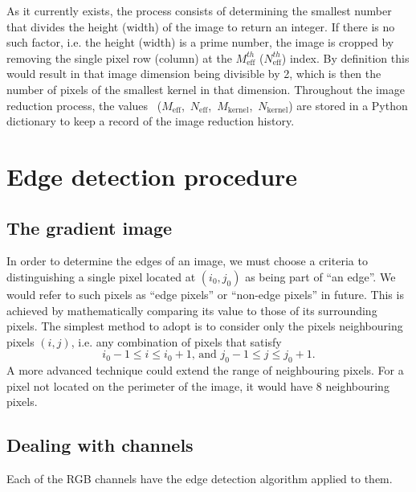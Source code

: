 \documentclass[11pt]{article}
\begin{document}
As it currently exists, the process consists of determining the smallest number that divides the height (width) of the image to return an integer. If there is no such factor, i.e. the height (width) is a prime number, the image is cropped by removing the single pixel row (column) at the $M_{\text{eff}}^{th}$ ($N_{\text{eff}}^{th}$) index. By definition this would result in that image dimension being divisible by 2, which is then the number of pixels of the smallest kernel in that dimension. Throughout the image reduction process, the values ~{($M_{\text{eff}}$,~$N_{\text{eff}}$,~$M_{\text{kernel}}$,~$N_{\text{kernel}}$)} are stored in a Python dictionary to keep a record of the image reduction history.




\section{Edge detection procedure}
\subsection{The gradient image}
In order to determine the edges of an image, we must choose a criteria to distinguishing a single pixel located at $(i_0,j_0)$ as being part of ``an edge''. We would refer to such pixels as ``edge pixels'' or ``non-edge pixels'' in future. This is achieved by mathematically comparing its value to those of its surrounding pixels. The simplest method to adopt is to consider only the pixels neighbouring pixels $(i,j)$, i.e. any combination of pixels that satisfy
\begin{equation}
i_0-1 \leq i \leq i_0+1\text{, and }j_0-1 \leq j \leq j_0+1\text{.}
\end{equation}
A more advanced technique could extend the range of neighbouring pixels. For a pixel not located on the perimeter of the image, it would have 8 neighbouring pixels. 

\subsection{Dealing with channels}
Each of the RGB channels have the edge detection algorithm applied to them. \\
\end{document}
